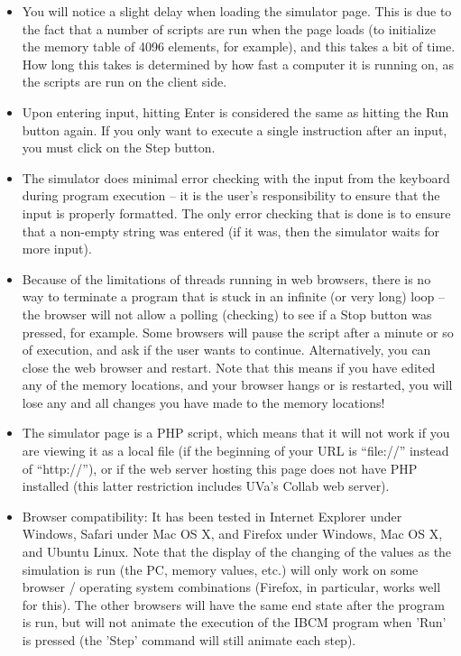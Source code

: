 \begin{itemize}

\item You will notice a slight delay when loading the simulator page.
  This is due to the fact that a number of scripts are run when the
  page loads (to initialize the memory table of 4096 elements, for
  example), and this takes a bit of time. How long this takes is
  determined by how fast a computer it is running on, as the scripts
  are run on the client side.

\item Upon entering input, hitting Enter is considered the same as
  hitting the Run button again. If you only want to execute a single
  instruction after an input, you must click on the Step button.

\item The simulator does minimal error checking with the input from
  the keyboard during program execution -- it is the user's
  responsibility to ensure that the input is properly formatted. The
  only error checking that is done is to ensure that a non-empty
  string was entered (if it was, then the simulator waits for more
  input).

\item Because of the limitations of threads running in web browsers,
  there is no way to terminate a program that is stuck in an infinite
  (or very long) loop -- the browser will not allow a polling
  (checking) to see if a Stop button was pressed, for example. Some
  browsers will pause the script after a minute or so of execution,
  and ask if the user wants to continue. Alternatively, you can close
  the web browser and restart. Note that this means if you have edited
  any of the memory locations, and your browser hangs or is restarted,
  you will lose any and all changes you have made to the memory
  locations!

\item The simulator page is a PHP script, which means that it will not
  work if you are viewing it as a local file (if the beginning of your
  URL is ``file://'' instead of ``http://''), or if the web server
  hosting this page does not have PHP installed (this latter
  restriction includes UVa's Collab web server).

\item Browser compatibility: It has been tested in Internet Explorer
  under Windows, Safari under Mac OS X, and Firefox under Windows, Mac
  OS X, and Ubuntu Linux. Note that the display of the changing of the
  values as the simulation is run (the PC, memory values, etc.) will
  only work on some browser / operating system combinations (Firefox,
  in particular, works well for this). The other browsers will have
  the same end state after the program is run, but will not animate
  the execution of the IBCM program when 'Run' is pressed (the 'Step'
  command will still animate each step).


\end{itemize}
